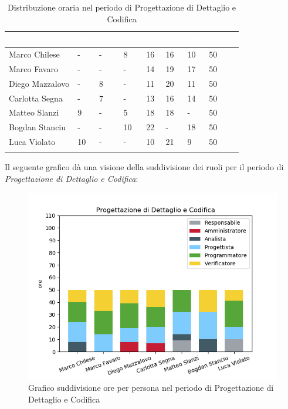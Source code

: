 \begin{longtable}{|C{.30\textwidth}|C{.06\textwidth}|C{.06\textwidth}|C{.06\textwidth} | C{.06\textwidth}| C{.06\textwidth} | C{.06\textwidth} | C{.10\textwidth} |}
	\hline
		\textbf{\textcolor{white}{Nome}} & \textbf{\textcolor{white}{RE}} & \textbf{\textcolor{white}{AM}} & \textbf{\textcolor{white}{AN}} & \textbf{\textcolor{white}{PJ}} & \textbf{\textcolor{white}{PR}} & \textbf{\textcolor{white}{VE}} & \textbf{\textcolor{white}{Totale}}\\
	\hline 
	Marco Chilese & - & - & 8 & 16 & 16 & 10 & 50 \\
	\hline
	Marco Favaro &  - & - & - & 14 & 19 & 17 & 50 \\
	\hline
	Diego Mazzalovo & - & 8 & - & 11 & 20 & 11 & 50 \\
	\hline
	Carlotta Segna & - & 7 & - & 13 & 16 & 14 & 50 \\
	\hline
	Matteo Slanzi & 9 & - & 5 & 18 & 18 & - & 50 \\
	\hline
	Bogdan Stanciu & - & - & 10 & 22 & - & 18 & 50 \\
	\hline
	Luca Violato & 10 & - & - & 10 & 21 & 9 & 50 \\   
	\hline


\caption{Distribuzione oraria nel periodo di Progettazione di Dettaglio e Codifica}
\label{Distribuzione oraria pdc}
\end{longtable}

Il seguente grafico dà una visione della suddivisione dei ruoli per il periodo di \textit{Progettazione di Dettaglio e Codifica}:

\begin{figure}[H]
	\centering
	\includegraphics[width=1\linewidth]{./images/fig_pdc.png}
	\caption{Grafico suddivisione ore per persona nel periodo di Progettazione di Dettaglio e Codifica}
	\label{fig:grafico suddivione ruoli periodo pdc}
\end{figure}

